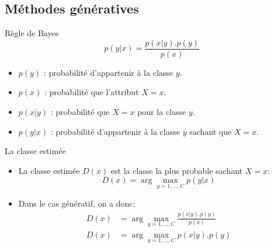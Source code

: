 \documentclass[8pt]{beamer}
\begin{document}
		\subsection{Méthodes génératives}
			\begin{frame}{Règle de Bayes}
				\begin{equation}
					p(y \vert x) = \frac{p(x \vert y).p(y)}{p(x)}
				\end{equation}
				\begin{itemize}
					\item $p(y)$ : probabilité d'appartenir à la classe $y$.
					\item $p(x)$ : probabilité que l'attribut $X=x$.
					\item $p(x \vert y)$  : probabilité que $X=x$ pour la classe $y$.
					\item $p(y \vert x)$  : probabilité d'appartenir à la classe $y$ sachant que $X=x$.
				\end{itemize}
			\end{frame}
			\begin{frame}{La classe estimée}
				\begin{itemize}
					\item<1-> La classe estimée \(D(x)\) est la classe la plus probable sachant $X=x$: 
						\begin{equation}
							D(x) = \arg \max_{y=1,\dots,C} p(y \vert x)
						\end{equation}
					\item<2-> Dans le cas génératif, on a donc:
						\begin{align}
							D(x) &= \arg \max_{y=1,\dots,C} \frac{p(x \vert y).p(y)}{p(x)}\\
							D(x) &= \arg \max_{y=1,\dots,C} p(x \vert y).p(y)
						\end{align}
				\end{itemize}
			\end{frame}
\end{document}
